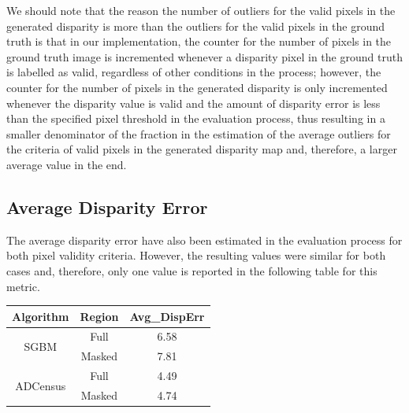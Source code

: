
We should note that the reason the number of outliers for the valid pixels in the generated disparity is more than the outliers for the valid pixels
in the ground truth is that in our implementation, the counter for the number of pixels in the ground truth image 
is incremented whenever a disparity pixel in the ground truth is labelled as valid, regardless of other conditions in the process; 
however, the counter for the number of pixels in the generated disparity
is only incremented whenever the disparity value is valid and the amount of disparity error is less than the specified pixel threshold in the evaluation process, thus resulting
in a smaller denominator of the fraction in the estimation of the average outliers for the criteria of valid pixels in the generated disparity map and, therefore, a larger 
average value in the end.

\subsection{Average Disparity Error}
The average disparity error have also been estimated in the evaluation process for both pixel validity criteria. However, the resulting values
were similar for both cases and, therefore, only one value is reported in the following table for this metric.

\begin{minipage}{0.8\linewidth}
\begin{center}
\label{tab:avgerr}
\begin{tabular}{ |c|c|c| }
\hline
Algorithm & Region & Avg\_DispErr \\ \hline
\multirow{2}{*}{SGBM} & Full & 6.58 \\ \cline{2-3}
& Masked & 7.81 \\ \hline
\multirow{2}{*}{ADCensus} & Full & 4.49 \\ \cline{2-3}
& Masked & 4.74 \\ \hline
\end{tabular}
\end{center}
\end{minipage} \newline

